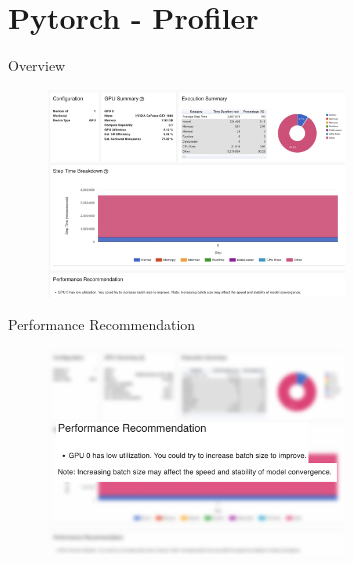 \documentclass[compress,aspectratio=169]{beamer}
\begin{document}
\section{Pytorch - Profiler}
\sectionIntro %

\begin{frame}{Overview}
	\vspace{-1em}
\begin{center}
    \begin{figure}
        \includegraphics[width=0.7\textwidth]{../../data/scap_gtx1080_profiler-torch_14650076}
    \end{figure}
\end{center}

\end{frame}

\begin{frame}{Performance Recommendation}

\begin{center}
    \begin{figure}
        \includegraphics[width=0.7\textwidth]{../../data/scap_gtx1080_profiler-torch_14650076_zoom}
    \end{figure}
\end{center}

\end{frame}
\end{document}
